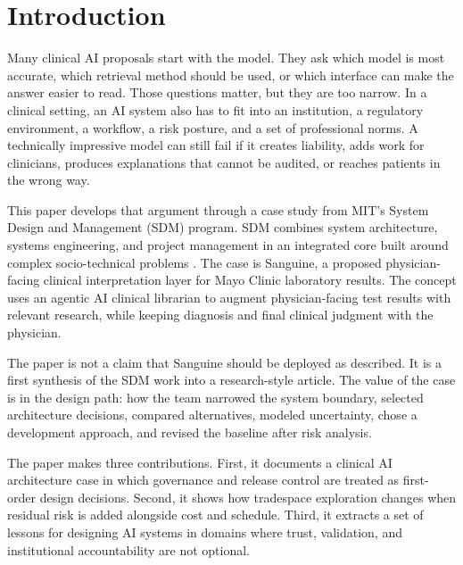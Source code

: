 \section{Introduction}

Many clinical AI proposals start with the model. They ask which model is most accurate, which retrieval method should be used, or which interface can make the answer easier to read. Those questions matter, but they are too narrow. In a clinical setting, an AI system also has to fit into an institution, a regulatory environment, a workflow, a risk posture, and a set of professional norms. A technically impressive model can still fail if it creates liability, adds work for clinicians, produces explanations that cannot be audited, or reaches patients in the wrong way.

This paper develops that argument through a case study from MIT's System Design and Management (SDM) program. SDM combines system architecture, systems engineering, and project management in an integrated core built around complex socio-technical problems \cite{mit_sdm_core}. The case is Sanguine, a proposed physician-facing clinical interpretation layer for Mayo Clinic laboratory results. The concept uses an agentic AI clinical librarian to augment physician-facing test results with relevant research, while keeping diagnosis and final clinical judgment with the physician.

The paper is not a claim that Sanguine should be deployed as described. It is a first synthesis of the SDM work into a research-style article. The value of the case is in the design path: how the team narrowed the system boundary, selected architecture decisions, compared alternatives, modeled uncertainty, chose a development approach, and revised the baseline after risk analysis.

The paper makes three contributions. First, it documents a clinical AI architecture case in which governance and release control are treated as first-order design decisions. Second, it shows how tradespace exploration changes when residual risk is added alongside cost and schedule. Third, it extracts a set of lessons for designing AI systems in domains where trust, validation, and institutional accountability are not optional.
